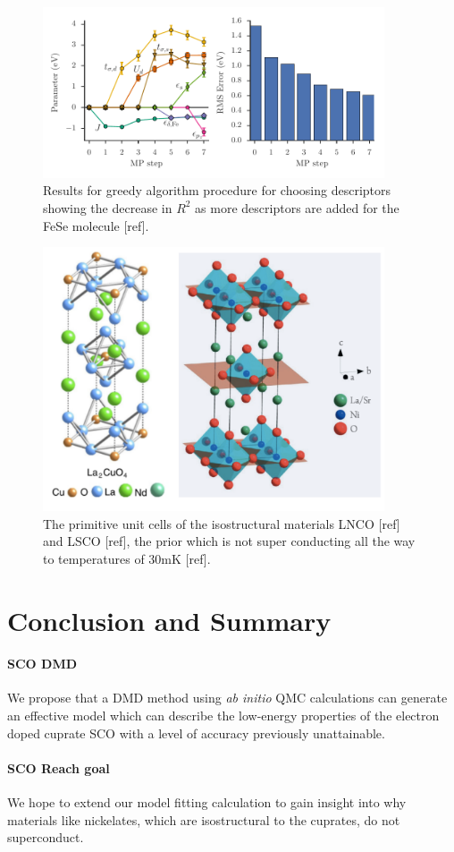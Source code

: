\documentclass{article}
\begin{document}
\begin{figure}[H]
\centering
\includegraphics[width=0.9\textwidth]{Figures/P1-fese_greed.pdf}
\caption{\label{fig6} Results for greedy algorithm procedure for choosing descriptors showing the decrease in $R^2$ as more descriptors are added for the FeSe molecule [ref].}
\end{figure}

\begin{figure}[H]
\centering
\includegraphics[width=0.9\textwidth]{Figures/P2-Ni_Cu.pdf}
\caption{\label{fig7} The primitive unit cells of the isostructural materials LNCO [ref] and LSCO [ref], the prior which is not super conducting all the way to temperatures of 30mK [ref].}
\end{figure}
\pagebreak

\section{Conclusion and Summary}
\paragraph{SCO DMD} We propose that a DMD method using \textit{ab initio} QMC calculations can generate an effective model which can describe the low-energy properties of the electron doped cuprate SCO with a level of accuracy previously unattainable.

\paragraph{SCO Reach goal} We hope to extend our model fitting calculation to gain insight into why materials like nickelates, which are isostructural to the cuprates, do not superconduct. 
\end{document}
